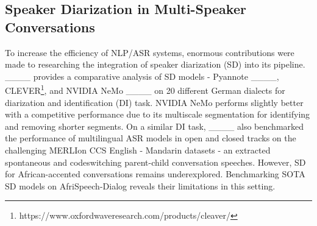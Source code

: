 \subsection{Speaker Diarization in Multi-Speaker Conversations}
To increase the efficiency of NLP/ASR systems, enormous contributions were made to researching the integration of speaker diarization (SD) into its pipeline. ____ provides a comparative analysis of SD models - Pyannote ____, CLEVER\footnote{https://www.oxfordwaveresearch.com/products/cleaver/}, and NVIDIA NeMo ____ on 20 different German dialects for diarization and identification (DI) task. NVIDIA NeMo performs slightly better with a competitive performance due to its multiscale segmentation for identifying and removing shorter segments. On a similar DI task, ____ also benchmarked the performance of multilingual ASR models in open and closed tracks on the challenging MERLIon CCS English - Mandarin datasets - an extracted spontaneous and codeswitching parent-child conversation speeches. However, SD for African-accented conversations remains underexplored. Benchmarking SOTA SD models on AfriSpeech-Dialog reveals their limitations in this setting.